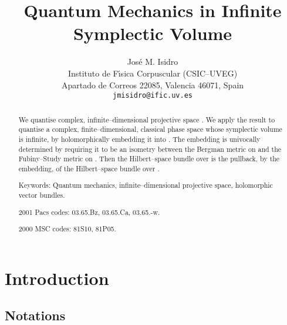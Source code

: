 \documentclass[a4paper,a4paper]{article}
\begin{document}
\title{Quantum Mechanics in Infinite Symplectic Volume}
\author{Jos\'e M. Isidro\\
Instituto de F\'{\i}sica Corpuscular (CSIC--UVEG)\\
Apartado de Correos 22085, Valencia 46071, Spain\\
{\tt jmisidro@ific.uv.es}}


\maketitle


\begin{abstract}
We quantise complex, infinite--dimensional projective space \coordHE{}.
We apply the result to quantise a complex, finite--dimensional, classical phase space 
\coordHE{} whose symplectic volume is infinite, by holomorphically embedding it into 
\coordHE{}. The embedding is univocally determined by requiring it to be an isometry 
between the Bergman metric on \coordHE{} and the Fubiny--Study metric on \coordHE{}.
Then the Hilbert--space bundle over \coordHE{} is the pullback, by the 
embedding, of the Hilbert--space bundle over \coordHE{}. 

Keywords: Quantum mechanics, infinite--dimensional projective space, holomorphic vector bundles.

2001 Pacs codes: 03.65.Bz, 03.65.Ca, 03.65.-w. 

2000 MSC codes: 81S10, 81P05.


\end{abstract}


\tableofcontents





\section{Introduction}\label{inntt}


\subsection{Notations}\label{nta}
\end{document}
